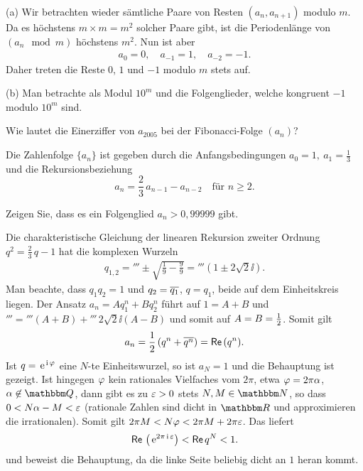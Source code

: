 \documentclass[11pt,a4paper]{article}
\begin{document}
\begin{beweis} 
(a) Wir betrachten wieder sämtliche Paare von Resten $(a_n, a_{n+1}) $ modulo
  $m$. Da es höchstens $m\times m =m^2 $ solcher Paare gibt, ist die
  Periodenlänge von $(a_n\mod{m})$ höchstens $m^2$. Nun ist aber
\begin{gather*}
a_0=0,\quad a_{-1} =1,\quad a_{-2}=-1.
\end{gather*}
Daher treten die Reste $0$, $1$ und $-1$ modulo $m$ stets auf.

(b) Man betrachte als Modul $10^m $ und die Folgenglieder, welche kongruent
$-1$ modulo $10^m$ sind.
\end{beweis}

\begin{aufgabe} Wie lautet die Einerziffer von $a_{2005}$ bei der 
Fibonacci-Folge $(a_n)$?
\end{aufgabe}
 
\begin{aufgabe}
Die Zahlenfolge $\{a_n\}$ ist gegeben durch die Anfangsbedingungen
$a_0=1,\ a_1=\frac13$ und die Rekursionsbeziehung
\[a_n=\frac23\,a_{n-1} - a_{n-2}\quad\text{für } n\ge 2.\]

Zeigen Sie, dass es ein Folgenglied $a_n>0{,}99999$ gibt.
\end{aufgabe}

\begin{loesung} 
Die charakteristische Gleichung der linearen Rekursion zweiter Ordnung $ q^2
=\frac{2}{3}\,q -1 $ hat die komplexen Wurzeln
\begin{gather*}
q_{1,2}=\third \pm\sqrt{\frac{1}{9} -\frac{9}{9}} =\third\left( 1\pm
2\sqrt{2}\ii\right) .
\end{gather*}
Man beachte, dass $q_1 q_2=1$ und $q_2=\overline{q_1}$, $q=q_1$, beide auf dem
Einheitskreis liegen.  Der Ansatz $a_n=Aq_1^n +Bq_2^n $ führt auf $1=A+B$ und
$\third= \third(A+B) +\third \,2\sqrt{2}\ii (A-B)$ und somit auf
$A=B=\frac{1}{2}$. Somit gilt
\begin{gather*}
a_n=\frac{1}{2}\left( q^n +\overline{q^n}\right) ={\sf Re}\, (q^n).
\end{gather*}
Ist $q=\,\mathrm{e}^{\,\mathrm{i}\, \varphi}$ eine $N$-te Einheitswurzel, so ist $a_N=1$ und die
Behauptung ist gezeigt. Ist hingegen $\varphi$ kein rationales Vielfaches vom
$2\pi$, etwa $\varphi = 2\pi\alpha$, $\al\not\in \Q$, dann gibt es zu $\varepsilon>0$ stets
$N,M\in\N $, so dass $0< N\alpha -M< \varepsilon$ (rationale Zahlen sind dicht in $\R $
und approximieren die irrationalen).  Somit gilt $2\pi M < N\varphi < 2\pi M +2\pi
\varepsilon$. Das liefert
\begin{gather*}
{\sf Re}\,\left(\,\mathrm{e}^{2\pi \,\mathrm{i}\, \varepsilon} \right) < {\sf Re}\, q^N < 1.
\end{gather*}
und beweist die Behauptung, da die linke Seite beliebig dicht an $1$ heran
kommt.
\end{loesung}
\end{document}

